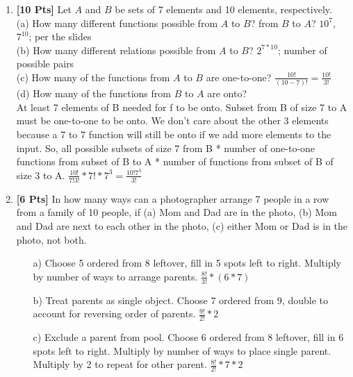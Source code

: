 \documentclass[11pt]{article}
\begin{document}
\begin{enumerate}
        \item {\bf [10 Pts]} Let $A$ and $B$ be sets of 7 elements and 10 elements, respectively. \\
        (a) How many different functions possible from $A$ to $B$? from $B$ to $A$? $10^7$, $7^{10}$; per the slides\\
        (b) How many different relations possible from $A$ to $B$? $2^{7*10}$; number of possible pairs \\
        (c) How many of the functions from $A$ to $B$ are one-to-one? $\frac{10!}{(10-7)!} = \frac{10!}{3!}$ \\
        (d) How many of the functions from $B$ to $A$ are onto? \\
        At least 7 elements of B needed for f to be onto. Subset from B of size 7 to A must be one-to-one to be onto. We don't care about the other 3 elements because a 7 to 7 function will still be onto if we add more elements to the input. So, all possible subsets of size 7 from B * number of one-to-one functions from subset of B to A * number of functions from subset of B of size 3 to A. $\frac{10!}{7!3!}*7!*7^3 = \frac{10!7^3}{3!}$

        \item {\bf [6 Pts]} In how many ways can a photographer arrange 7 people in a row from a family of 10 people, if (a) Mom and Dad are in the photo, (b) Mom and Dad are next to each other in the photo, (c) either Mom or Dad is in the photo, not both. \\
        \begin{enumerate}
                \item[a)] Choose 5 ordered from 8 leftover, fill in 5 spots left to right. Multiply by number of ways to arrange parents. $\frac{8!}{3!}*(6*7)$
                \item[b)] Treat parents as single object. Choose 7 ordered from 9, double to account for reversing order of parents. $\frac{9!}{2!}*2$
                \item[c)] Exclude a parent from pool. Choose 6 ordered from 8 leftover, fill in 6 spots left to right. Multiply by number of ways to place single parent. Multiply by 2 to repeat for other parent. $\frac{8!}{2!}*7*2$
        \end{enumerate}


\end{enumerate}
\end{document}
